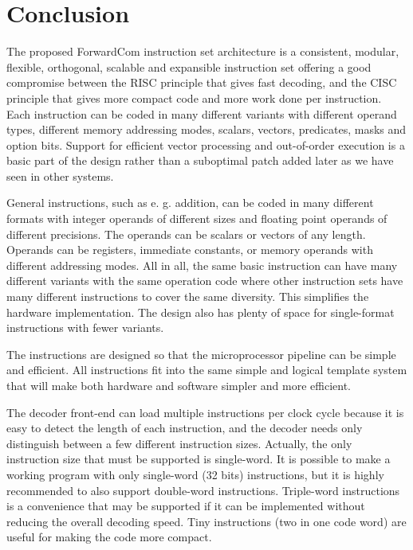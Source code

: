 \documentclass[forwardcom.tex]{subfiles}
\begin{document}
\RaggedRight

\chapter{Conclusion}
The proposed ForwardCom instruction set architecture is a consistent, modular, 
flexible, orthogonal, scalable and expansible instruction set offering a good compromise between the RISC principle that gives fast decoding, and the CISC principle that gives more compact code and more work done per instruction. Each instruction can be coded in many different variants with different operand types, different memory addressing modes, scalars, vectors, predicates, masks and option bits. Support for efficient vector processing and out-of-order execution is a basic part of the design rather than a suboptimal patch added later as we have seen in other systems.
\vspace{2mm}

General instructions, such as e. g. addition, can be coded in many different formats with integer operands of different sizes and floating point operands of different precisions. The operands can be scalars or vectors of any length. Operands can be registers, immediate constants, or memory operands with different addressing modes. All in all, the same basic instruction can have many different variants with the same operation code where other instruction sets have many different instructions to cover the same diversity. This simplifies the hardware implementation. The design also has plenty of space for single-format instructions with fewer variants. 
\vspace{2mm}

The instructions are designed so that the microprocessor pipeline can be simple and efficient. All instructions fit into the same simple and logical template system that will make both hardware and software simpler and more efficient.
\vspace{2mm}

The decoder front-end can load multiple instructions per clock cycle because it is easy to detect the length of each instruction, and the decoder needs only distinguish between a few different instruction sizes. Actually, the only instruction size that must be supported is single-word. It is 
possible to make a working program with only single-word (32 bits) instructions, but it is highly recommended to also support double-word instructions. Triple-word instructions is a convenience that may be supported if it can be implemented without reducing the overall decoding speed. Tiny instructions (two in one code word) are useful for making the code more compact. 
\vspace{2mm}
\end{document}
